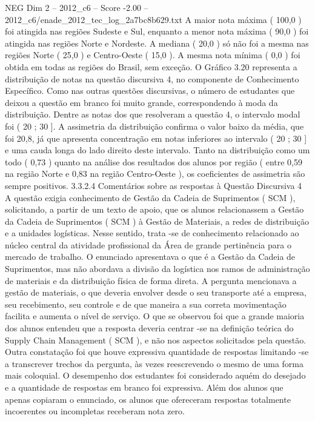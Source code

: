 \begin{textsample}{NEG Dim 2 – 2012\_c6 – Score -2.00 – 2012\_c6/enade\_2012\_tec\_log\_2a7bc8b629.txt}
A maior nota máxima ( 100,0 ) foi atingida nas regiões Sudeste e Sul, enquanto a menor nota máxima ( 90,0 ) foi atingida nas regiões Norte e Nordeste.
A mediana ( 20,0 ) só não foi a mesma nas regiões Norte ( 25,0 ) e Centro-Oeste ( 15,0 ).
A mesma nota mínima ( 0,0 ) foi obtida em todas as regiões do Brasil, sem exceção.
O Gráfico 3.20 representa a distribuição de notas na questão discursiva 4, no componente de Conhecimento Específico.
Como nas outras questões discursivas, o número de estudantes que deixou a questão em branco foi muito grande, correspondendo à moda da distribuição.
Dentre as notas dos que resolveram a questão 4, o intervalo modal foi ( 20 ; 30 ].
A assimetria da distribuição confirma o valor baixo da média, que foi 20,8, já que apresenta concentração em notas inferiores ao intervalo ( 20 ; 30 ] e uma cauda longa do lado direito deste intervalo.
Tanto na distribuição como um todo ( 0,73 ) quanto na análise dos resultados dos alunos por região ( entre 0,59 na região Norte e 0,83 na região Centro-Oeste ), os coeficientes de assimetria são sempre positivos. 3.3.2.4 Comentários sobre as respostas à Questão Discursiva 4 A questão exigia conhecimento de Gestão da Cadeia de Suprimentos ( SCM ), solicitando, a partir de um texto de apoio, que os alunos relacionassem a Gestão da Cadeia de Suprimentos ( SCM ) à Gestão de Materiais, a redes de distribuição e a unidades logísticas.
Nesse sentido, trata -se de conhecimento relacionado ao núcleo central da atividade profissional da Área de grande pertinência para o mercado de trabalho.
O enunciado apresentava o que é a Gestão da Cadeia de Suprimentos, mas não abordava a divisão da logística nos ramos de administração de materiais e da distribuição física de forma direta.
A pergunta mencionava a gestão de materiais, o que deveria envolver desde o seu transporte até a empresa, seu recebimento, seu controle e de que maneira a sua correta movimentação facilita e aumenta o nível de serviço.
O que se observou foi que a grande maioria dos alunos entendeu que a resposta deveria centrar -se na definição teórica do Supply Chain Management ( SCM ), e não nos aspectos solicitados pela questão.
Outra constatação foi que houve expressiva quantidade de respostas limitando -se a transcrever trechos da pergunta, às vezes reescrevendo o mesmo de uma forma mais coloquial.
O desempenho dos estudantes foi considerado aquém do desejado e a quantidade de respostas em branco foi expressiva.
Além dos alunos que apenas copiaram o enunciado, os alunos que ofereceram respostas totalmente incoerentes ou incompletas receberam nota zero.

\end{textsample}
